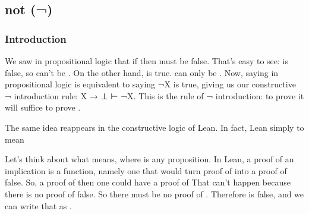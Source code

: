 \documentclass[letterpaper,10pt,english]{sphinxmanual}
\begin{document}
\subsection{not (¬)}
\label{\detokenize{A_02_Constructive_Logic:not}}
\begin{sphinxVerbatim}[commandchars=\\\{\}]
\end{sphinxVerbatim}


\subsubsection{Introduction}
\label{\detokenize{A_02_Constructive_Logic:id1}}
\sphinxAtStartPar
We saw in propositional logic that if  then
 must be false. That’s easy to see:  is
false, so  can’t be . On the other hand,  is true.  can only be . Now, saying  in propositional logic is equivalent to saying
¬X is true, giving us our constructive ¬ introduction rule:
X → ⊥ ⊢ ¬X. This is the rule of ¬ introduction: to prove
 it will suffice to prove .

\sphinxAtStartPar
The same idea reappears in the constructive logic of Lean.
In fact, Lean simply   to mean 

\begin{sphinxVerbatim}[commandchars=\\\{\}]
 
\end{sphinxVerbatim}

\sphinxAtStartPar
Let’s think about what  means, where  is any
proposition. In Lean, a proof of an implication is a function,
namely one that would turn  proof of  into a proof of
false. So,  a proof of  then one could have
a proof of  That can’t happen because there is no proof
of false. So there must be no proof of . Therefore  is
false, and we can write that as .
\end{document}
